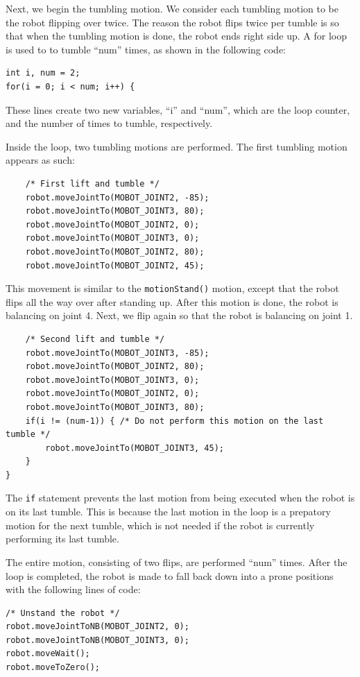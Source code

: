 \documentclass{article}
\begin{document}
Next, we begin the tumbling motion. We consider each tumbling motion to be the 
robot flipping over twice. The reason the robot flips twice per tumble is so that
when the tumbling motion is done, the robot ends right side up. 
A for loop is used to to tumble ``num'' times, as shown in the following code:
\begin{verbatim}
int i, num = 2;
for(i = 0; i < num; i++) {
\end{verbatim}
These lines create two new variables, ``i'' and ``num'', which are the loop
counter, and the number of times to tumble, respectively. 

Inside the loop, two tumbling motions are performed. The first tumbling
motion appears as such:
\begin{verbatim}
    /* First lift and tumble */
    robot.moveJointTo(MOBOT_JOINT2, -85);
    robot.moveJointTo(MOBOT_JOINT3, 80);
    robot.moveJointTo(MOBOT_JOINT2, 0);
    robot.moveJointTo(MOBOT_JOINT3, 0);
    robot.moveJointTo(MOBOT_JOINT2, 80);
    robot.moveJointTo(MOBOT_JOINT2, 45);
\end{verbatim}
This movement is similar to the \texttt{motionStand()} motion, except that the
robot flips all the way over after standing up. After this motion is done,
the robot is balancing on joint 4. Next, we flip again so that the robot
is balancing on joint 1.
\begin{verbatim}
    /* Second lift and tumble */
    robot.moveJointTo(MOBOT_JOINT3, -85);
    robot.moveJointTo(MOBOT_JOINT2, 80);
    robot.moveJointTo(MOBOT_JOINT3, 0);
    robot.moveJointTo(MOBOT_JOINT2, 0);
    robot.moveJointTo(MOBOT_JOINT3, 80);
    if(i != (num-1)) { /* Do not perform this motion on the last tumble */
        robot.moveJointTo(MOBOT_JOINT3, 45);
    }
}
\end{verbatim}
The \texttt{if} statement prevents the last motion from being executed
when the robot is on its last tumble. This is because the last motion in the
loop is a prepatory motion for the next tumble, which is not needed if the
robot is currently performing its last tumble. 

The entire motion, consisting of two flips, are performed ``num'' times. After
the loop is completed, the robot is made to fall back down into a prone
positions with the following lines of code:
\begin{verbatim}
/* Unstand the robot */
robot.moveJointToNB(MOBOT_JOINT2, 0);
robot.moveJointToNB(MOBOT_JOINT3, 0);
robot.moveWait();
robot.moveToZero();
\end{verbatim}
\end{document}
